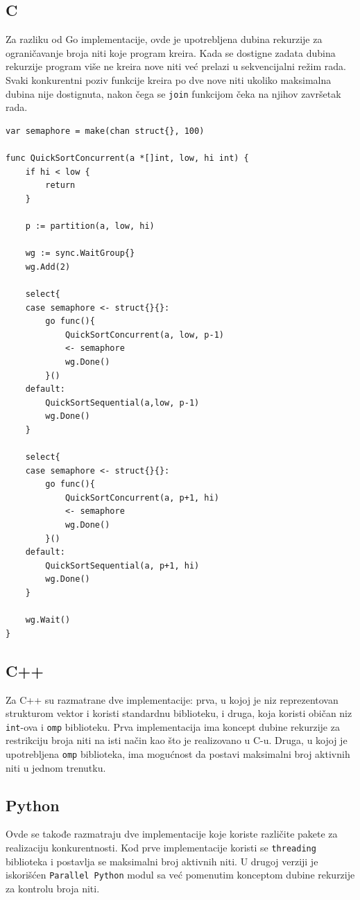 \documentclass[12pt,oneside]{memoir}
\begin{document}
\subsection{C}
Za razliku od Go implementacije, ovde je upotrebljena dubina rekurzije za ograničavanje broja niti koje program kreira. Kada se dostigne zadata dubina rekurzije program više ne kreira nove niti već prelazi u sekvencijalni režim rada. Svaki konkurentni poziv funkcije kreira po dve nove niti ukoliko maksimalna dubina nije dostignuta, nakon čega se \texttt{join} funkcijom čeka na njihov završetak rada.

\begin{center}
\begin{lstlisting}[caption=Go implementacija konkurentne quicksort funkcije,label={lst:qs},  backgroundcolor=\color{background}]
var semaphore = make(chan struct{}, 100)

func QuickSortConcurrent(a *[]int, low, hi int) {
	if hi < low {
		return
	}

	p := partition(a, low, hi)

	wg := sync.WaitGroup{}
	wg.Add(2)

	select{
	case semaphore <- struct{}{}:
		go func(){
			QuickSortConcurrent(a, low, p-1)
			<- semaphore
			wg.Done()
		}()
	default:
		QuickSortSequential(a,low, p-1)
		wg.Done()
	}

	select{
	case semaphore <- struct{}{}:
		go func(){
			QuickSortConcurrent(a, p+1, hi)
			<- semaphore
			wg.Done()
		}()
	default:
		QuickSortSequential(a, p+1, hi)
		wg.Done()
	}

	wg.Wait()
}
\end{lstlisting}
\end{center}

\subsection{C++}
Za C++ su razmatrane dve implementacije: prva, u kojoj je niz reprezentovan strukturom vektor i koristi standardnu biblioteku, i druga, koja koristi običan niz \texttt{int}-ova i \texttt{omp} biblioteku. Prva implementacija ima koncept dubine rekurzije za restrikciju broja niti na isti način kao što je realizovano u C-u. Druga, u kojoj je upotrebljena \texttt{omp} biblioteka, ima mogućnost da postavi maksimalni broj aktivnih niti u jednom trenutku.


\subsection{Python}
Ovde se takođe razmatraju dve implementacije koje koriste različite pakete za realizaciju konkurentnosti. Kod prve implementacije koristi se \texttt{threading} biblioteka i postavlja se maksimalni broj aktivnih niti. U drugoj verziji je iskorišćen \texttt{Parallel Python} modul sa već pomenutim konceptom dubine rekurzije za kontrolu broja niti. 
\end{document}
